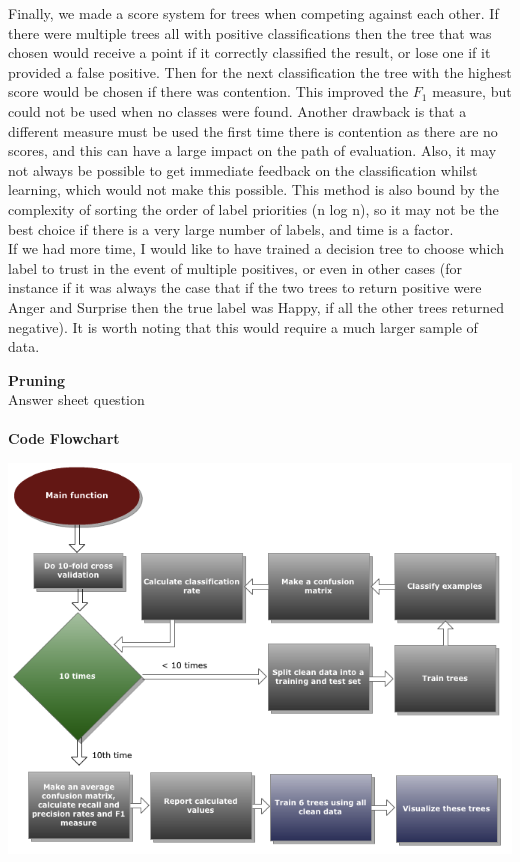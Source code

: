 \documentclass[12pt]{article}
\begin{document}
Finally, we made a score system for trees when competing against each other. If there were multiple trees all with positive classifications then the tree that was chosen would receive a point if it correctly classified the result, or lose one if it provided a false positive. Then for the next classification the tree with the highest score would be chosen if there was contention. This improved the \( F_1 \) measure, but could not be used when no classes were found. Another drawback is that a different measure must be used the first time there is contention as there are no scores, and this can have a large impact on the path of evaluation. Also, it may not always be possible to get immediate feedback on the classification whilst learning, which would not make this possible. This method is also bound by the complexity of sorting the order of label priorities (n log n), so it may not be the best choice if there is a very large number of labels, and time is a factor. \\

If we had more time, I would like to have trained a decision tree to choose which label to trust in the event of multiple positives, or even in other cases (for instance if it was always the case that if the two trees to return positive were Anger and Surprise then the true label was Happy, if all the other trees returned negative). It is worth noting that this would require a much larger sample of data.

{\bf Pruning} \\
Answer sheet question\\ \\

{\bf Code Flowchart} \\
\begin{center}
  \includegraphics{report-images/flowchart.png}
\end{center}
\end{document}
